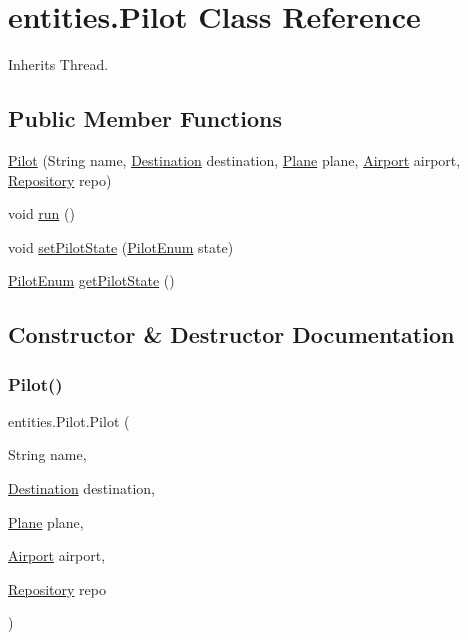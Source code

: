 \hypertarget{classentities_1_1_pilot}{}\section{entities.\+Pilot Class Reference}
\label{classentities_1_1_pilot}


Inherits Thread.

\subsection*{Public Member Functions}
\begin{DoxyCompactItemize}
\item 
\hyperlink{classentities_1_1_pilot_a9d5d09281d60d0c8f36662320f1cfa49}{Pilot} (String name, \hyperlink{classshared_regions_1_1_destination}{Destination} destination, \hyperlink{classshared_regions_1_1_plane}{Plane} plane, \hyperlink{classshared_regions_1_1_airport}{Airport} airport, \hyperlink{classshared_regions_1_1_repository}{Repository} repo)
\item 
void \hyperlink{classentities_1_1_pilot_aa0a1f2dd8931f01b03cdc2aa9e99acaf}{run} ()
\item 
void \hyperlink{classentities_1_1_pilot_a1eb8f6f3fd60fbf50829491b6e263ab9}{set\+Pilot\+State} (\hyperlink{enumentities_1_1_pilot_enum}{Pilot\+Enum} state)
\item 
\hyperlink{enumentities_1_1_pilot_enum}{Pilot\+Enum} \hyperlink{classentities_1_1_pilot_ac16922ae9aa6296ff7adfb1dcfa50d3a}{get\+Pilot\+State} ()
\end{DoxyCompactItemize}


\subsection{Constructor \& Destructor Documentation}
\mbox{\label{classentities_1_1_pilot_a9d5d09281d60d0c8f36662320f1cfa49}} 
\subsubsection{\texorpdfstring{Pilot()}{Pilot()}}
{\footnotesize\ttfamily entities.\+Pilot.\+Pilot (\begin{DoxyParamCaption}\item[{String}]{name,  }\item[{\hyperlink{classshared_regions_1_1_destination}{Destination}}]{destination,  }\item[{\hyperlink{classshared_regions_1_1_plane}{Plane}}]{plane,  }\item[{\hyperlink{classshared_regions_1_1_airport}{Airport}}]{airport,  }\item[{\hyperlink{classshared_regions_1_1_repository}{Repository}}]{repo }\end{DoxyParamCaption})\hspace{0.3cm}{\ttfamily [inline]}}

